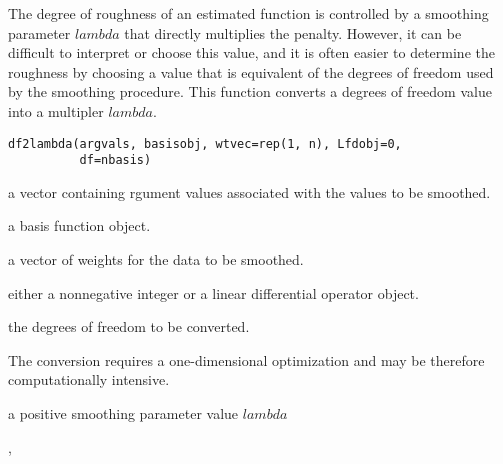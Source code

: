 \documentclass{article}
\begin{document}
\begin{Description}\relax
The degree of roughness of an estimated function is controlled by a
smoothing parameter $lambda$ that directly multiplies the penalty.
However, it can be difficult to interpret or choose this value, and it
is often easier to determine the roughness by choosing a value that is
equivalent of the degrees of freedom used by the smoothing procedure.
This function converts a degrees of freedom value into a multipler
$lambda$.
\end{Description}
\begin{Usage}
\begin{verbatim}
df2lambda(argvals, basisobj, wtvec=rep(1, n), Lfdobj=0,
          df=nbasis)
\end{verbatim}
\end{Usage}
\begin{Arguments}
\begin{ldescription}
\item[\code{argvals}] a vector containing rgument values associated with the values to
be smoothed.

\item[\code{basisobj}] a basis function object.

\item[\code{wtvec}] a vector of weights for the data to be smoothed.

\item[\code{Lfdobj}] either a nonnegative integer or a linear differential operator object.

\item[\code{df}] the degrees of freedom to be converted.

\end{ldescription}
\end{Arguments}
\begin{Details}\relax
The conversion requires a one-dimensional optimization and may be
therefore computationally intensive.
\end{Details}
\begin{Value}
a positive smoothing parameter value $lambda$
\end{Value}
\begin{SeeAlso}\relax
{}, 
\end{SeeAlso}
\end{document}

